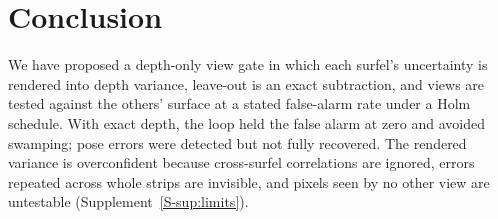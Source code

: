 \section{Conclusion}
\label{sec:conclusion}
We have proposed a depth-only view gate in which each surfel's uncertainty is rendered into depth variance,
leave-out is an exact subtraction, and views are tested against the others' surface at a stated false-alarm
rate under a Holm schedule. With exact depth, the loop held the false alarm at zero and avoided swamping;
pose errors were detected but not fully recovered. The rendered variance is overconfident because
cross-surfel correlations are ignored, errors repeated across whole strips are invisible, and pixels seen
by no other view are untestable (Supplement~\ref{S-sup:limits}).
